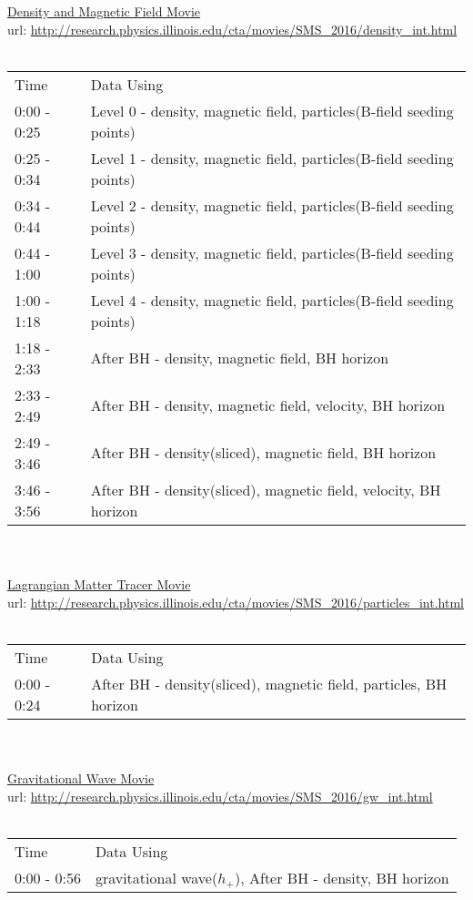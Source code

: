 \documentclass{article}
\begin{document}
\underline{Density and Magnetic Field Movie} \\
url: \url{http://research.physics.illinois.edu/cta/movies/SMS_2016/density_int.html} \\
\\
\begin{tabular}{l l}
Time		& Data Using \\
0:00 - 0:25	& Level 0 - density, magnetic field, particles(B-field seeding points) \\
0:25 - 0:34	& Level 1 - density, magnetic field, particles(B-field seeding points) \\
0:34 - 0:44	& Level 2 - density, magnetic field, particles(B-field seeding points) \\
0:44 - 1:00	& Level 3 - density, magnetic field, particles(B-field seeding points) \\
1:00 - 1:18	& Level 4 - density, magnetic field, particles(B-field seeding points) \\
1:18 - 2:33	& After BH - density, magnetic field, BH horizon \\
2:33 - 2:49	& After BH - density, magnetic field, velocity, BH horizon \\
2:49 - 3:46	& After BH - density(sliced), magnetic field, BH horizon \\
3:46 - 3:56	& After BH - density(sliced), magnetic field, velocity, BH horizon \\
\end{tabular}
\\
\\
\underline{Lagrangian Matter Tracer Movie} \\
url: \url{http://research.physics.illinois.edu/cta/movies/SMS_2016/particles_int.html} \\
\\
\begin{tabular}{l l}
Time		& Data Using \\
0:00 - 0:24	& After BH - density(sliced), magnetic field, particles, BH horizon \\
\end{tabular}
\\
\\
\underline{Gravitational Wave Movie} \\
url: \url{http://research.physics.illinois.edu/cta/movies/SMS_2016/gw_int.html} \\
\\
\begin{tabular}{l l}
Time		& Data Using \\
0:00 - 0:56	& gravitational wave($h_+$), After BH - density, BH horizon \\
\end{tabular}
\end{document}
